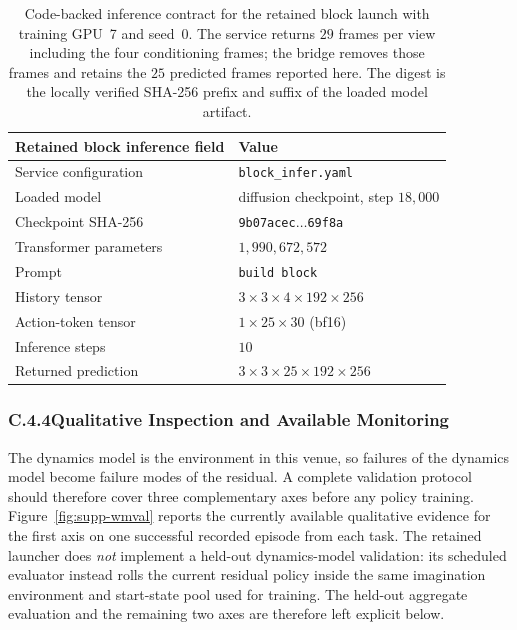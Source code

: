 \documentclass[letterpaper]{article} %
\begin{document}
\begin{table}[t]
\centering\small\setlength{\tabcolsep}{4pt}
\begin{tabular}{@{}ll@{}}
\toprule
Retained block inference field & Value \\
\midrule
Service configuration & \texttt{block\_infer.yaml} \\
Loaded model & diffusion checkpoint, step $18{,}000$ \\
Checkpoint SHA-256 & \texttt{9b07acec$\ldots$69f8a} \\
Transformer parameters & $1{,}990{,}672{,}572$ \\
Prompt & \texttt{build block} \\
History tensor & $3\times3\times4\times192\times256$ \\
Action-token tensor & $1\times25\times30$ (bf16) \\
Inference steps & $10$ \\
Returned prediction & $3\times3\times25\times192\times256$ \\
\bottomrule
\end{tabular}
\caption{Code-backed inference contract for the retained block launch with
training GPU~7 and seed~0. The service returns $29$
frames per view including the four conditioning frames; the bridge removes
those frames and retains the $25$ predicted frames reported here. The digest is
the locally verified SHA-256 prefix and suffix of the loaded model artifact.}
\label{tab:block-wm-runtime}
\end{table}

\subsubsection{C.4.4\quad Qualitative Inspection and Available Monitoring}

The dynamics model is the environment in this venue, so failures of the dynamics
model become failure modes of the residual. A complete validation protocol
should therefore cover three complementary axes before any policy training.
Figure~\ref{fig:supp-wmval} reports the currently available qualitative evidence
for the first axis on one successful recorded episode from each task. The
retained launcher does \emph{not} implement a held-out dynamics-model
validation: its scheduled evaluator instead rolls the current residual policy
inside the same imagination environment and start-state pool used for
training. The held-out aggregate evaluation and the remaining two axes are
therefore left explicit below.
\end{document}
